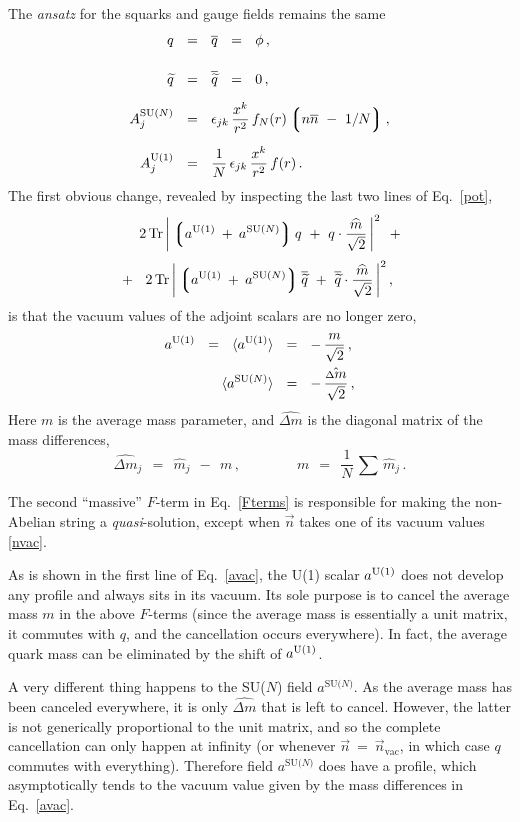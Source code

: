 \documentclass[12pt]{article}
\def\beq{\begin{equation}}
\def\eeq{\end{equation}}
\newcommand{\wt}{\widetilde}
\newcommand{\ov}{\overline}
\newcommand{\lgr}{\left\lgroup}
\newcommand{\rgr}{\right\rgroup}
\newcommand{\aU}{a^{\rm U(1)}}
\newcommand{\aN}{a^\text{SU($N$)}}
\newcommand{\nnbar}{n\ov{n}}
\newcommand{\qt}{\wt{q}}
\newcommand{\bq}{\ov{q}}
\newcommand{\bqt}{\overline{\widetilde{q}}}
\newcommand{\Tr}{\text{Tr}}
\newcommand{\dm}{\hat{{\scriptstyle \Delta} m}}
\newcommand{\mhat}{\widehat{m}}
\newcommand{\nvac}{\vec{n}{}_\text{vac}}
\newcommand{\ansatz}{{\it ansatz} }
\begin{document}
	The \ansatz for the squarks and gauge fields remains the same
\begin{align}
%
\notag
	q    & ~~=~~    \bq    ~~=~~    \phi\,,    \\[4mm]
%
\notag
	\qt    & ~~=~~    \bqt    ~~=~~    0\,,    \\[2mm]
%
\label{qAansatz}
	A_j^\text{SU($N$)}    & ~~=~~    \epsilon_{jk}\, \frac{x^k}{r^2}\, f_N(r) \lgr \nnbar ~-~ 1/N \rgr ,
	\\[2mm]
%
\notag
	A_j^\text{U(1)}    & ~~=~~    \frac{1}{N}\, \epsilon_{jk}\, \frac{x^k}{r^2}\, f(r)\,.
\end{align}
	The first obvious change, revealed by inspecting the last two lines of Eq.~\eqref{pot}, 
\begin{align}
%
\notag
	&
	\phantom{~~+~~}
	2\, \Tr\, \bigg| \lgr \aU \:+\: \aN \rgr q  ~+~  q \cdot \frac{\mhat}{\sqrt{2}} \,\bigg|^2
	~~+~~
	\\[1mm]
%
\label{Fterms}
	&
	~~+~~
	2\, \Tr\, \bigg| \lgr \aU \:+\: \aN \rgr \bqt  ~+~  \bqt \cdot \frac{\mhat}{\sqrt{2}} \,\bigg|^2
	\,,
\end{align}
	is that the vacuum values of the adjoint scalars are no longer zero,
\begin{align}
%
\notag
	\aU    ~~=~~    \langle \aU \rangle    & ~~=~~    -\, \frac{m}{\sqrt{2}}\,,
	\\
%
\label{avac}
	\langle \aN \rangle    & ~~=~~ -\, \frac{\dm}{\sqrt{2}}\,,
\end{align}
	Here $ m $ is the average mass parameter, and $ \dm $ is the diagonal matrix of the mass differences,
\beq
	\dm{}_j    ~~=~~    \mhat{}_j  ~~-~~  m\,,
	\qquad\qquad
	m    ~~=~~ \frac{1}{N}\, \sum\, \mhat{}_j\,.
\eeq
	
	The second ``massive'' $ F $-term in Eq.~\eqref{Fterms} is responsible 
	for making the non-Abelian string a {\it quasi}-solution, 
	except when $ \vec{n} $ takes one of its vacuum values \eqref{nvac}.
	
	As is shown in the first line of Eq.~\eqref{avac}, the U(1) scalar $ \aU $ does not develop
	any profile and always sits in its vacuum.
	Its sole purpose is to cancel the average mass $ m $ in the above $ F $-terms 
	(since the average mass is essentially a unit matrix, it commutes with $ q $, and the 
	cancellation occurs everywhere). In fact, the average quark mass can be 
	eliminated by the shift of $ \aU $.

	A very different thing happens to the SU($N$) field $ \aN $.
	As the average mass has been canceled everywhere, it is only $ \dm $ that is left to cancel.
	However, the latter is not generically proportional to the unit matrix, and so the complete cancellation
	can only happen at infinity (or whenever $ \vec{n} ~=~ \nvac $, in which
	case $ q $ commutes with everything).
	Therefore field $ \aN $ does have a profile, 
	which asymptotically tends to the vacuum value given by the mass differences in Eq.~\eqref{avac}.
\end{document}
